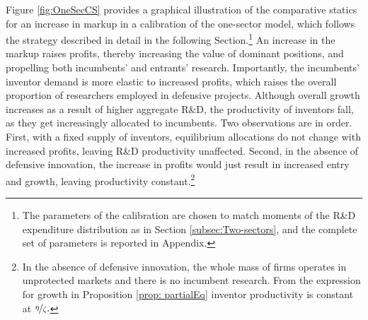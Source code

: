 Figure \ref{fig:OneSecCS} provides a graphical illustration of the
comparative statics for an increase in markup in a calibration of
the one-sector model, which follows the strategy described in detail
in the following Section.\footnote{The parameters of the calibration are chosen to match moments of the
R\&D expenditure distribution as in Section \ref{subsec:Two-sectors},
and the complete set of parameters is reported in Appendix. } An increase in the markup raises profits, thereby increasing the
value of dominant positions, and propelling both incumbents' and entrants'
research. Importantly, the incumbents' inventor demand is more elastic
to increased profits, which raises the overall proportion of researchers
employed in defensive projects. Although overall growth increases
as a result of higher aggregate R\&D, the productivity of inventors
fall, as they get increasingly allocated to incumbents. Two observations
are in order. First, with a fixed supply of inventors, equilibrium
allocations do not change with increased profits, leaving R\&D productivity
unaffected. Second, in the absence of defensive innovation, the increase
in profits would just result in increased entry and growth, leaving
productivity constant.\footnote{In the absence of defensive innovation, the whole mass of firms operates
in unprotected markets and there is no incumbent research. From the
expression for growth in Proposition \ref{prop: partialEq} inventor
productivity is constant at $\nicefrac{\eta}{\zeta}.$}

